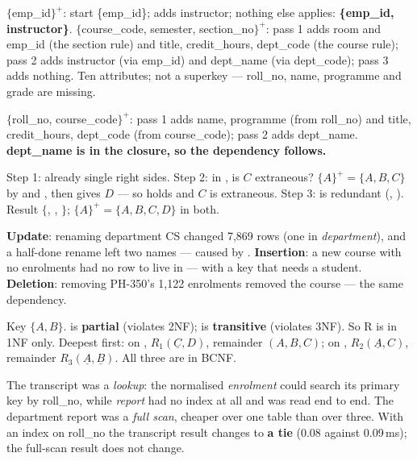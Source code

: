\begin{ans}
  \item $\{$emp\_id$\}^{+}$: start \{emp\_id\};  adds
        instructor; nothing else applies: \textbf{\{emp\_id, instructor\}}.
        $\{$course\_code, semester, section\_no$\}^{+}$: pass 1 adds room and
        emp\_id (the section rule) and title, credit\_hours, dept\_code (the
        course rule); pass 2 adds instructor (via emp\_id) and dept\_name (via
        dept\_code); pass 3 adds nothing. Ten attributes; not a superkey ---
        roll\_no, name, programme and grade are missing.
  \item $\{$roll\_no, course\_code$\}^{+}$: pass 1 adds name, programme (from
        roll\_no) and title, credit\_hours, dept\_code (from course\_code);
        pass 2 adds dept\_name. \textbf{dept\_name is in the closure, so the
        dependency follows.}
  \item Step 1: already single right sides. Step 2: in , is $C$
        extraneous? $\{A\}^{+} = \{A, B, C\}$ by  and , then
         gives $D$ --- so  holds and $C$ is extraneous.
        Step 3:  is redundant (, ). Result
        $\{$, , $\}$; $\{A\}^{+} = \{A,B,C,D\}$ in
        both.
\end{ans}

\begin{ans}
  \item \textbf{Update}: renaming department CS changed 7{,}869 rows (one in
        \textit{department}), and a half-done rename left two names --- caused
        by . \textbf{Insertion}: a new course with no
        enrolments had no row to live in --- 
        with a key that needs a student. \textbf{Deletion}: removing PH-350's
        1{,}122 enrolments removed the course --- the same dependency.
  \item Key $\{A, B\}$.  is \textbf{partial} (violates 2NF);
         is \textbf{transitive} (violates 3NF). So R is in 1NF only.
        Deepest first: on , $R_1(\underline{C}, D)$, remainder
        $(A, B, C)$; on , $R_2(\underline{A}, C)$, remainder
        $R_3(\underline{A}, \underline{B})$. All three are in BCNF.
  \item The transcript was a \emph{lookup}: the normalised \textit{enrolment}
        could search its primary key by roll\_no, while \textit{report} had no
        index at all and was read end to end. The department report was a
        \emph{full scan}, cheaper over one table than over three. With an index
        on roll\_no the transcript result changes to \textbf{a tie} (0.08 against
        0.09\,ms); the full-scan result does not change.
\end{ans}

